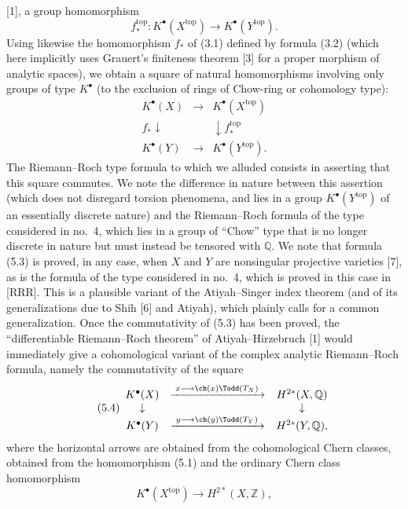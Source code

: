 [1], a group homomorphism
\begin{equation}\tag{5.2}
f^{\mathrm{top}}_*:K^\bullet(X^{\mathrm{top}})\longrightarrow K^\bullet(Y^{\mathrm{top}}).
\end{equation}
Using likewise the homomorphism $f_*$ of (3.1) defined by formula (3.2) (which here implicitly uses Grauert's finiteness theorem [3] for a proper morphism of analytic spaces), we obtain a square of natural homomorphisms involving only groups of type $K^\bullet$ (to the exclusion of rings of Chow-ring or cohomology type):
\begin{equation}\tag{5.3}
\begin{array}{ccc}
K^\bullet(X) & \longrightarrow & K^\bullet(X^{\mathrm{top}}) \\
f_*\downarrow && \downarrow f^{\mathrm{top}}_* \\
K^\bullet(Y) & \longrightarrow & K^\bullet(Y^{\mathrm{top}}).
\end{array}
\end{equation}
The Riemann--Roch type formula to which we alluded consists in asserting that this square commutes. We note the difference in nature between this assertion (which does not disregard torsion phenomena, and lies in a group $K^\bullet(Y^{\mathrm{top}})$ of an essentially discrete nature) and the Riemann--Roch formula of the type considered in no.~4, which lies in a group of ``Chow'' type that is no longer discrete in nature but must instead be tensored with $\mathbb Q$. We note that formula (5.3) is proved, in any case, when $X$ and $Y$ are nonsingular projective varieties [7], as is the formula of the type considered in no.~4, which is proved in this case in [RRR]. This is a plausible variant of the Atiyah--Singer index theorem (and of its generalizations due to Shih [6] and Atiyah), which plainly calls for a common generalization. Once the commutativity of (5.3) has been proved, the ``differentiable Riemann--Roch theorem'' of Atiyah--Hirzebruch [1] would immediately give a cohomological variant of the complex analytic Riemann--Roch formula, namely the commutativity of the square
\begin{equation}\tag{5.4}
\begin{array}{ccc}
K^\bullet(X) & \xrightarrow{\;x\longrightarrow \ch(x)\Todd(T_X)\;} & H^{2*}(X,\mathbb Q) \\
\downarrow && \downarrow \\
K^\bullet(Y) & \xrightarrow{\;y\longrightarrow \ch(y)\Todd(T_Y)\;} & H^{2*}(Y,\mathbb Q),
\end{array}
\end{equation}
where the horizontal arrows are obtained from the cohomological Chern classes, obtained from the homomorphism (5.1) and the ordinary Chern class homomorphism
\[
K^\bullet(X^{\mathrm{top}})\longrightarrow H^{2*}(X,\mathbb Z),
\]

